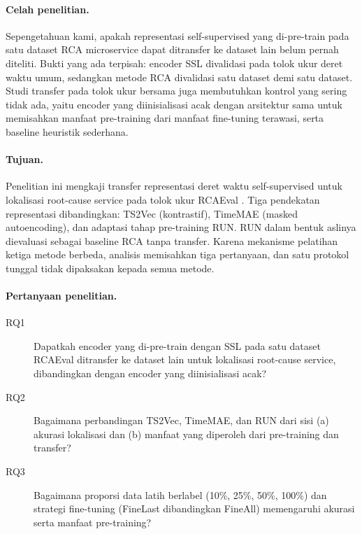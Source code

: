 \paragraph{Celah penelitian.} Sepengetahuan kami, apakah representasi self-supervised yang di-pre-train pada satu dataset RCA microservice dapat ditransfer ke dataset lain belum pernah diteliti. Bukti yang ada terpisah: encoder SSL divalidasi pada tolok ukur deret waktu umum, sedangkan metode RCA divalidasi satu dataset demi satu dataset. Studi transfer pada tolok ukur bersama juga membutuhkan kontrol yang sering tidak ada, yaitu encoder yang diinisialisasi acak dengan arsitektur sama untuk memisahkan manfaat pre-training dari manfaat fine-tuning terawasi, serta baseline heuristik sederhana.

\paragraph{Tujuan.} Penelitian ini mengkaji transfer representasi deret waktu self-supervised untuk lokalisasi root-cause service pada tolok ukur RCAEval \cite{pham2024rcaeval}. Tiga pendekatan representasi dibandingkan: TS2Vec (kontrastif), TimeMAE (masked autoencoding), dan adaptasi tahap pre-training RUN. RUN dalam bentuk aslinya dievaluasi sebagai baseline RCA tanpa transfer. Karena mekanisme pelatihan ketiga metode berbeda, analisis memisahkan tiga pertanyaan, dan satu protokol tunggal tidak dipaksakan kepada semua metode.

\paragraph{Pertanyaan penelitian.}
\begin{description}
\item[RQ1] Dapatkah encoder yang di-pre-train dengan SSL pada satu dataset RCAEval ditransfer ke dataset lain untuk lokalisasi root-cause service, dibandingkan dengan encoder yang diinisialisasi acak?
\item[RQ2] Bagaimana perbandingan TS2Vec, TimeMAE, dan RUN dari sisi (a) akurasi lokalisasi dan (b) manfaat yang diperoleh dari pre-training dan transfer?
\item[RQ3] Bagaimana proporsi data latih berlabel (10\%, 25\%, 50\%, 100\%) dan strategi fine-tuning (FineLast dibandingkan FineAll) memengaruhi akurasi serta manfaat pre-training?
\end{description}


